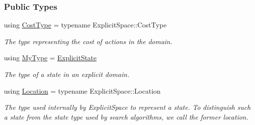 \subsubsection*{Public Types}
\begin{DoxyCompactItemize}
\item 
using \hyperlink{structExplicitState_aa49e13944e1f40aaeb4ed7190234b21e}{Cost\+Type} = typename Explicit\+Space\+::\+Cost\+Type\hypertarget{structExplicitState_aa49e13944e1f40aaeb4ed7190234b21e}{}\label{structExplicitState_aa49e13944e1f40aaeb4ed7190234b21e}

\begin{DoxyCompactList}\small\item\em The type representing the cost of actions in the domain. \end{DoxyCompactList}\item 
using \hyperlink{structExplicitState_af241851bd63508f24157e7a0a71c924a}{My\+Type} = \hyperlink{structExplicitState}{Explicit\+State}\hypertarget{structExplicitState_af241851bd63508f24157e7a0a71c924a}{}\label{structExplicitState_af241851bd63508f24157e7a0a71c924a}

\begin{DoxyCompactList}\small\item\em The type of a state in an explicit domain. \end{DoxyCompactList}\item 
using \hyperlink{structExplicitState_a3801fbf90c7e687071c21a05de368748}{Location} = typename Explicit\+Space\+::\+Location\hypertarget{structExplicitState_a3801fbf90c7e687071c21a05de368748}{}\label{structExplicitState_a3801fbf90c7e687071c21a05de368748}

\begin{DoxyCompactList}\small\item\em The type used internally by {\ttfamily Explicit\+Space} to represent a state. To distinguish such a state from the state type used by search algorithms, we call the former {\ttfamily location}. \end{DoxyCompactList}\end{DoxyCompactItemize}
